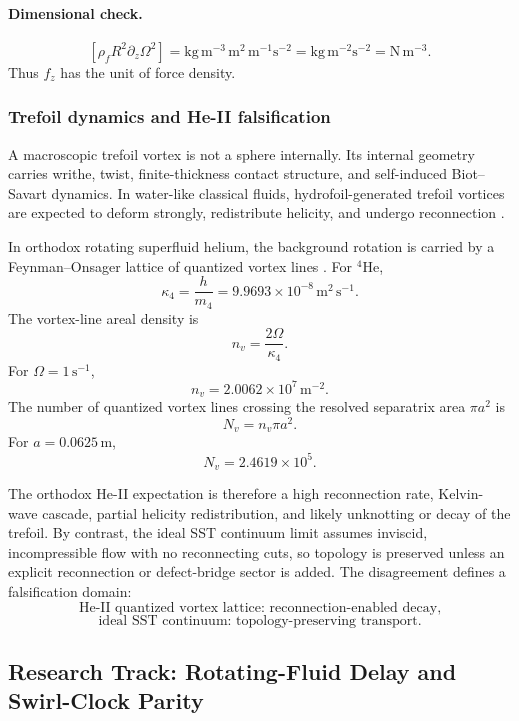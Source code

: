 \paragraph{Dimensional check.}
\[
[\rho_{\!f}R^2\partial_z\Omega^2]
=\mathrm{kg\,m^{-3}}\,\mathrm{m^2}\,\mathrm{m^{-1}s^{-2}}
=\mathrm{kg\,m^{-2}s^{-2}}
=\mathrm{N\,m^{-3}}.
\]
Thus \(f_z\) has the unit of force density.

\subsubsection{Trefoil dynamics and He-II falsification}

A macroscopic trefoil vortex is not a sphere internally.  Its internal geometry
carries writhe, twist, finite-thickness contact structure, and self-induced
Biot--Savart dynamics.  In water-like classical fluids, hydrofoil-generated
trefoil vortices are expected to deform strongly, redistribute helicity, and
undergo reconnection \cite{KlecknerIrvine2013,KoplikLevine1993}.

In orthodox rotating superfluid helium, the background rotation is carried by a
Feynman--Onsager lattice of quantized vortex lines \cite{Onsager1949,Feynman1955}.
For \({}^4\mathrm{He}\),
\[
\kappa_4=\frac{h}{m_4}=9.9693\times10^{-8}\,\mathrm{m^2\,s^{-1}}.
\]
The vortex-line areal density is
\[
n_v=\frac{2\Omega}{\kappa_4}.
\]
For \(\Omega=1\,\mathrm{s^{-1}}\),
\[
\boxed{
n_v=2.0062\times10^7\,\mathrm{m^{-2}}.
}
\]
The number of quantized vortex lines crossing the resolved separatrix area
\(\pi a^2\) is
\[
N_v=n_v\pi a^2.
\]
For \(a=0.0625\,\mathrm m\),
\[
\boxed{
N_v=2.4619\times10^5.
}
\]

The orthodox He-II expectation is therefore a high reconnection rate,
Kelvin-wave cascade, partial helicity redistribution, and likely unknotting or
decay of the trefoil.  By contrast, the ideal SST continuum limit assumes
inviscid, incompressible flow with no reconnecting cuts, so topology is preserved
unless an explicit reconnection or defect-bridge sector is added.  The
disagreement defines a falsification domain:
\[
\boxed{\text{He-II quantized vortex lattice: reconnection-enabled decay,}}
\]
\[
\boxed{\text{ideal SST continuum: topology-preserving transport.}}
\]

\subsection{Research Track: Rotating-Fluid Delay and Swirl-Clock Parity}
\label{sec:rotating_fluid_swirl_clock_parity}

